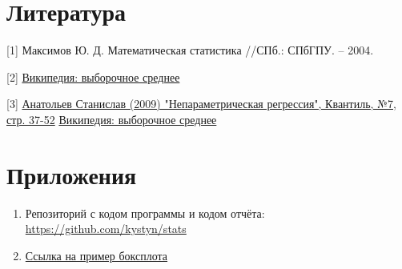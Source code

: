 \section{Литература}
[1] Максимов Ю. Д. Математическая статистика //СПб.: СПбГПУ. – 2004.

[2] \href{https://ru.wikipedia.org/wiki/%D0%92%D1%8B%D0%B1%D0%BE%D1%80%D0%BE%D1%87%D0%BD%D0%BE%D0%B5_%D1%81%D1%80%D0%B5%D0%B4%D0%BD%D0%B5%D0%B5}{Википедия: выборочное среднее}

[3]
\href{http://quantile.ru/07/07-SA.pdf}{Анатольев Станислав (2009) "Непараметрическая регрессия", Квантиль, №7, стр. 37-52} \href{https://ru.wikipedia.org/wiki/%D0%92%D1%8B%D0%B1%D0%BE%D1%80%D0%BE%D1%87%D0%BD%D0%BE%D0%B5_%D1%81%D1%80%D0%B5%D0%B4%D0%BD%D0%B5%D0%B5}{Википедия: выборочное среднее}

\section{Приложения}

\begin{enumerate}
	\item Репозиторий с кодом программы и кодом отчёта: \href{https://github.com/kystyn/stats}{https://github.com/kystyn/stats}
	
	\item \href{https://towardsdatascience.com/understanding-boxplots-5e2df7bcbd51}{Ссылка на пример боксплота}\label{bplotex}
\end{enumerate}